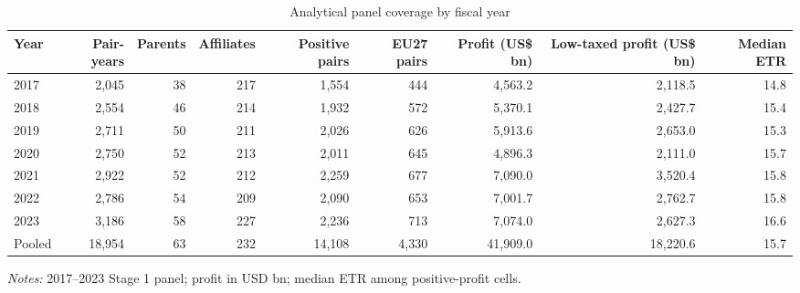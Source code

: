 \begin{table}[H]
\centering
\footnotesize
\setlength{\tabcolsep}{3pt}
\caption[Analytical panel coverage by fiscal year]{Analytical panel coverage by fiscal year}
\label{tab:data_panel_coverage}
\begin{tabular}{@{}lrrrrrrrr@{}}
\toprule
Year & Pair-years & Parents & Affiliates & Positive pairs & EU27 pairs & Profit (US\$ bn) & Low-taxed profit (US\$ bn) & Median ETR \\
\midrule
2017 & 2,045 & 38 & 217 & 1,554 & 444 & 4,563.2 & 2,118.5 & 14.8 \\
2018 & 2,554 & 46 & 214 & 1,932 & 572 & 5,370.1 & 2,427.7 & 15.4 \\
2019 & 2,711 & 50 & 211 & 2,026 & 626 & 5,913.6 & 2,653.0 & 15.3 \\
2020 & 2,750 & 52 & 213 & 2,011 & 645 & 4,896.3 & 2,111.0 & 15.7 \\
2021 & 2,922 & 52 & 212 & 2,259 & 677 & 7,090.0 & 3,520.4 & 15.8 \\
2022 & 2,786 & 54 & 209 & 2,090 & 653 & 7,001.7 & 2,762.7 & 15.8 \\
2023 & 3,186 & 58 & 227 & 2,236 & 713 & 7,074.0 & 2,627.3 & 16.6 \\
Pooled & 18,954 & 63 & 232 & 14,108 & 4,330 & 41,909.0 & 18,220.6 & 15.7 \\
\bottomrule
\end{tabular}

\vspace{0.35em}
\noindent\begin{minipage}{\textwidth}
\footnotesize\raggedright\textit{Notes:} 2017--2023 Stage 1 panel; profit in USD bn; median ETR among positive-profit cells.
\end{minipage}
\end{table}
